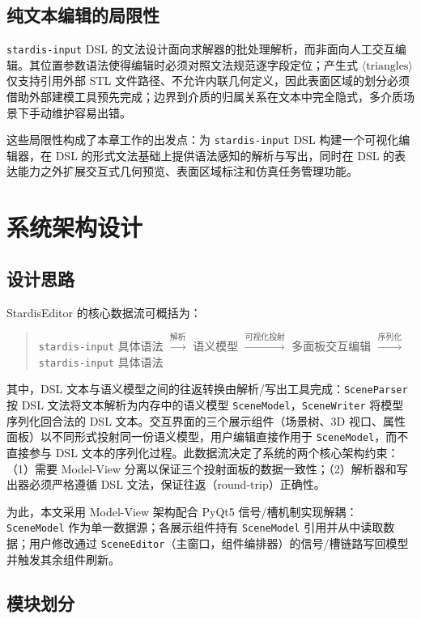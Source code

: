 \subsection{纯文本编辑的局限性}

\texttt{stardis-input} DSL 的文法设计面向求解器的批处理解析，而非面向人工交互编辑。其位置参数语法使得编辑时必须对照文法规范逐字段定位；产生式 $\langle\text{triangles}\rangle$ 仅支持引用外部 STL 文件路径、不允许内联几何定义，因此表面区域的划分必须借助外部建模工具预先完成；边界到介质的归属关系在文本中完全隐式，多介质场景下手动维护容易出错。

这些局限性构成了本章工作的出发点：为 \texttt{stardis-input} DSL 构建一个可视化编辑器，在 DSL 的形式文法基础上提供语法感知的解析与写出，同时在 DSL 的表达能力之外扩展交互式几何预览、表面区域标注和仿真任务管理功能。

\section{系统架构设计}
\label{sec:gui:architecture}

\subsection{设计思路}

StardisEditor 的核心数据流可概括为：
%
\begin{quote}
\texttt{stardis-input} 具体语法 $\xrightarrow{\text{解析}}$ 语义模型 $\xrightarrow{\text{可视化投射}}$ 多面板交互编辑 $\xrightarrow{\text{序列化}}$ \texttt{stardis-input} 具体语法
\end{quote}
%
其中，DSL 文本与语义模型之间的往返转换由解析/写出工具完成：\texttt{SceneParser} 按 DSL 文法将文本解析为内存中的语义模型 \texttt{SceneModel}，\texttt{SceneWriter} 将模型序列化回合法的 DSL 文本。交互界面的三个展示组件（场景树、3D 视口、属性面板）以不同形式投射同一份语义模型，用户编辑直接作用于 \texttt{SceneModel}，而不直接参与 DSL 文本的序列化过程。此数据流决定了系统的两个核心架构约束：（1）需要 Model-View 分离以保证三个投射面板的数据一致性；（2）解析器和写出器必须严格遵循 DSL 文法，保证往返（round-trip）正确性。

为此，本文采用 Model-View 架构配合 PyQt5 信号/槽机制实现解耦：\texttt{SceneModel} 作为单一数据源；各展示组件持有 \texttt{SceneModel} 引用并从中读取数据；用户修改通过 \texttt{SceneEditor}（主窗口，组件编排器）的信号/槽链路写回模型并触发其余组件刷新。

\subsection{模块划分}

